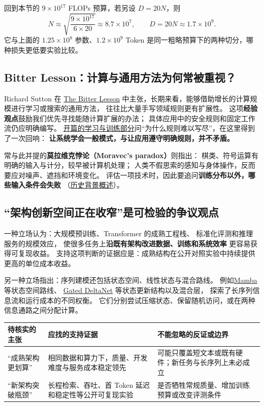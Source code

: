\par{}
\begin{samepage}
回到本节的 $9\times10^{17}$ FLOPs 预算，若另设 $D=20N$，则
\[
N\approx\sqrt{\frac{9\times10^{17}}{6\times20}}
\approx8.7\times10^7,\qquad D=20N\approx1.7\times10^9.
\]
它与上面的 $1.25\times10^8$ 参数、$1.2\times10^9$ Token 是同一粗略预算下的两种切分，哪种损失更低要实验比较。
\end{samepage}

\subsection{Bitter Lesson：计算与通用方法为何常被重视？}

Richard Sutton 在
\href{http://www.incompleteideas.net/IncIdeas/BitterLesson.html}{The Bitter Lesson}
中主张，长期来看，能够借助增长的计算规模进行学习或搜索的通用方法，
往往比大量手写领域规则更有扩展性。
这项\textbf{经验观点}鼓励我们优先寻找能随计算扩展的办法；
具体应用中的安全规则和固定工作流仍应明确编写。
\hyperref[part:learning]{开篇的学习与训练部分}问“为什么规则难以写尽”，在这里得到了一次回响：
\textbf{让系统学会一般模式，与让应用遵守明确规则，并不矛盾。}

常与此并提的\textbf{莫拉维克悖论（Moravec's paradox）}则指出：
棋类、符号运算有明确的输入与计分，较早被计算机处理；
人类不假思索的感知与身体操作，反而要应对噪声、遮挡和环境变化。
评估一项技术时，因此要追问\textbf{训练分布以外，哪些输入条件会失败}
（\href{https://en.wikipedia.org/wiki/Moravec%27s_paradox}{历史背景概述}）。

\subsection{“架构创新空间正在收窄”是可检验的争议观点}

一种立场认为：大规模预训练、Transformer 的成熟工程栈、
标准化评测和推理服务的规模效应，
使很多任务上\textbf{沿既有架构改进数据、训练和系统效率}
更容易获得可复现收益。
支持这项判断的证据应是：成熟结构在公开对照实验中持续提供更高的单位成本收益。

另一种立场指出：序列建模还包括状态空间、线性状态与混合路线。
例如\hyperref[source:mamba]{Mamba}
等状态空间路线、
\hyperref[source:gated-delta]{Gated DeltaNet}
等状态更新结构以及混合层，
探索了长序列信息流和运行成本的不同权衡。
它们分别尝试压缩状态、保留随机访问，或在两种信息通路之间分配计算。

\begin{center}\small
{}
\begin{tabularx}{\linewidth}{@{}>{\raggedright\arraybackslash}p{27mm}>{\raggedright\arraybackslash}p{49mm}>{\raggedright\arraybackslash}X@{}}
\toprule
待核实的主张 & 应找的支持证据 & 不能忽略的反证或边界\\\midrule
“成熟架构更划算” &
相同数据和算力下，质量、开发难度与服务成本稳定领先 &
可能只覆盖短文本或既有硬件；新任务与长序列上未必成立\\
“新架构突破瓶颈” &
长程检索、吞吐、首 Token 延迟和稳定性等公开可复现实验 &
是否牺牲常规质量、增加训练预算或改变评测条件\\
\bottomrule
\end{tabularx}
\end{center}

